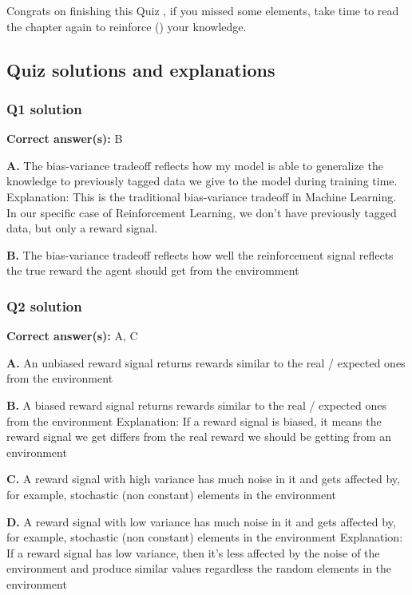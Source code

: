 \documentclass[11pt,a4paper]{article}
\begin{document}
Congrats on finishing this Quiz , if you missed some elements, take time to read the chapter again to reinforce () your knowledge.

\subsection{Quiz solutions and explanations}\label{quiz-solutions-and-explanations}

\subsubsection{Q1 solution}\label{q1-solution}

\textbf{Correct answer(s):} B

\textbf{A.} The bias-variance tradeoff reflects how my model is able to generalize the knowledge to previously tagged data we give to the model during training time. Explanation: This is the traditional bias-variance tradeoff in Machine Learning. In our specific case of Reinforcement Learning, we don't have previously tagged data, but only a reward signal.

\textbf{B.} The bias-variance tradeoff reflects how well the reinforcement signal reflects the true reward the agent should get from the enviromment

\subsubsection{Q2 solution}\label{q2-solution}

\textbf{Correct answer(s):} A, C

\textbf{A.} An unbiased reward signal returns rewards similar to the real / expected ones from the environment

\textbf{B.} A biased reward signal returns rewards similar to the real / expected ones from the environment Explanation: If a reward signal is biased, it means the reward signal we get differs from the real reward we should be getting from an environment

\textbf{C.} A reward signal with high variance has much noise in it and gets affected by, for example, stochastic (non constant) elements in the environment

\textbf{D.} A reward signal with low variance has much noise in it and gets affected by, for example, stochastic (non constant) elements in the environment Explanation: If a reward signal has low variance, then it's less affected by the noise of the environment and produce similar values regardless the random elements in the environment
\end{document}
